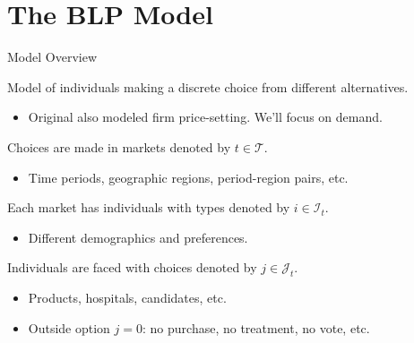 \documentclass[aspectratio=169,t,11pt,table]{beamer}
\begin{document}
\section{The BLP Model}

\begin{frame}{Model Overview}
    \begin{wideitemize}
        \item Model of individuals making a discrete choice from different alternatives.
        \begin{itemize}
            \item Original also modeled firm price-setting. We'll focus on demand.
        \end{itemize}
        \pause
        \item Choices are made in \alert{markets} denoted by $t \in \mathcal{T}$.
        \begin{itemize}
            \item Time periods, geographic regions, period-region pairs, etc.
        \end{itemize}
        \pause
        \item Each market has \alert{individuals} with types denoted by $i \in \mathcal{I}_t$.
        \begin{itemize}
            \item Different demographics and preferences.
        \end{itemize}
        \pause
        \item Individuals are faced with \alert{choices} denoted by $j \in \mathcal{J}_t$.
        \begin{itemize}
            \item Products, hospitals, candidates, etc.
            \item Outside option $j = 0$: no purchase, no treatment, no vote, etc.
        \end{itemize}
    \end{wideitemize}
\end{frame}
\end{document}
